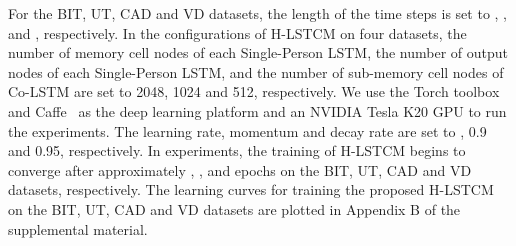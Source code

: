 \documentclass[9pt,journal,letterpaper,twocolumn]{IEEEtran}
\begin{document}
	
	
	
	For the BIT, UT, CAD and VD datasets, the length  of the time steps is set to , ,  and , respectively. In the configurations of H-LSTCM on four datasets, the number of memory cell nodes of each Single-Person LSTM, the number of output nodes of each Single-Person LSTM, and the number of sub-memory cell nodes of Co-LSTM are set to 2048, 1024 and 512, respectively. We use the Torch toolbox and Caffe~\cite{jia2014caffe} as the deep learning platform and an NVIDIA Tesla K20 GPU to run the experiments. The learning rate, momentum and decay rate are set to , 0.9 and 0.95, respectively. In experiments, the training of H-LSTCM begins to converge after approximately , ,  and  epochs on the BIT, UT, CAD and VD datasets, respectively. The learning curves for training the proposed H-LSTCM on the BIT, UT, CAD and VD datasets are plotted in Appendix B of the supplemental material.
	


		
	
\end{document}
